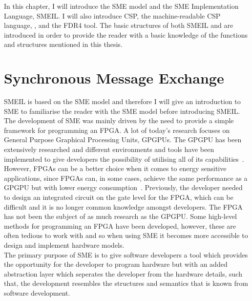 In this chapter, I will introduce the SME model and the SME Implementation Language, SMEIL. I will also introduce CSP, the machine-readable CSP language, \cspm{}, and the FDR4 tool. The basic structures of both SMEIL and \cspm{} are introduced in order to provide the reader with a basic knowledge of the functions and structures mentioned in this thesis.
\section{Synchronous Message Exchange}
SMEIL is based on the SME model and therefore I will give an introduction to SME to familiarise the reader with the SME model before introducing SMEIL.
\\

The development of SME was mainly driven by the need to provide a simple framework for programming an FPGA. A lot of today's research focuses on General Purpose Graphical Processing Units, GPGPUs.
The GPGPU has been extensively researched and different environments and tools have been implemented to give developers the possibility of utilising all of its capabilities~\cite{Vinter2014}.
However, FPGAs can be a better choice when it comes to energy sensitive applications, since FPGAs can, in some cases, achieve the same performance as a GPGPU but with lower energy consumption~\cite{Vinter2014}.
Previously, the developer needed to design an integrated circuit on the gate level for the FPGA, which can be difficult and it is no longer common knowledge amongst developers. The FPGA has not been the subject of as much research as the GPGPU. Some high-level methods for programming an FPGA have been developed, however, these are often tedious to work with and so when using SME it becomes more accessible to design and implement hardware models.\\

The primary purpose of SME is to give software developers a tool which provides the opportunity for the developer to program hardware but with an added abstraction layer which seperates the developer from the hardware details, such that, the development resembles the structures and semantics that is known from software development.\\

